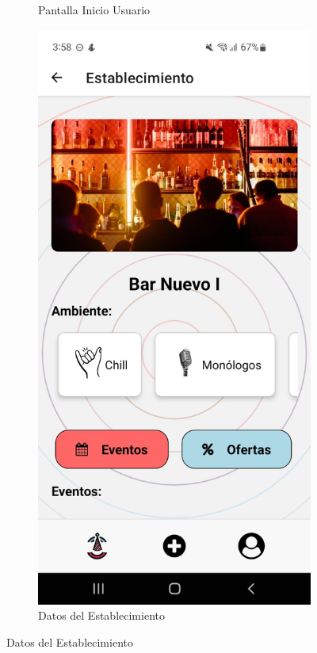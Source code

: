 \begin{figure}[H]
\begin{subfigure}{0.45\textwidth}
        \caption{Pantalla Inicio Usuario}
        \label{fig:img5}
    \end{subfigure}%
    \hfill
    \begin{subfigure}{0.45\textwidth}
        \centering
        \includegraphics[width=\linewidth]{imagenes/Capturas/DatosEstablecimientoUsuario.jpeg}
        \caption{Datos del Establecimiento}
        \label{fig:img6}
    \end{subfigure}
\end{figure}
\vspace*{\fill}

